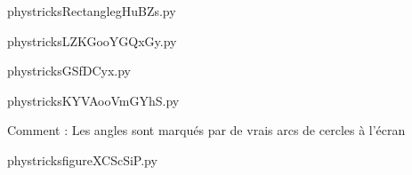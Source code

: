    

    \clearpage
    


    \newcommand{\CaptionFigRectanglegHuBZs}{<+Type your caption here+>}
    \begin{center}
        
    \end{center}
    phystricksRectanglegHuBZs.py

    

    \clearpage
    


    \newcommand{\CaptionFigLZKGooYGQxGy}{<+Type your caption here+>}
    \begin{center}
        
    \end{center}
    phystricksLZKGooYGQxGy.py

    

    \clearpage
    


    \newcommand{\CaptionFigGSfDCyx}{<+Type your caption here+>}
    \begin{center}
        
    \end{center}
    phystricksGSfDCyx.py

    

    \clearpage
    


    \newcommand{\CaptionFigKYVAooVmGYhS}{<+Type your caption here+>}
    \begin{center}
        
    \end{center}
    phystricksKYVAooVmGYhS.py

    Comment : Les angles sont marqués par de vrais arcs de cercles à l'écran

    \clearpage
    


    \newcommand{\CaptionFigfigureXCScSiP}{<+Type your caption here+>}
    \begin{center}
        
    \end{center}
    phystricksfigureXCScSiP.py

    

    \clearpage
    

